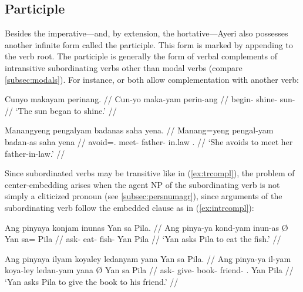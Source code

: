 \subsection{Participle}
\label{subsec:participle}
Besides the imperative---and, by extension, the hortative---Ayeri also 
possesses another infinite form called the participle. This form is marked by 
appending  to the verb root. The participle is generally the 
form of verbal complements of intransitive subordinating verbs other than 
modal verbs (compare \autoref{subsec:modals}). For instance,  
 or  both allow 
complementation with another verb:

\pex
\a\label{ex:intrcompl}\begingl
	\gla Cunyo makayam perinang. // 
	\glb Cun-yo maka-yam perin-ang // 
	\glc begin-\TsgN{} shine-\Ptcp{} sun-\Aarg{} //
	\glft `The sun began to shine.' //
\endgl

\a\label{ex:trcompl}\begingl
	\gla Manangyeng pengalyam badanas saha yena. //
	\glb Manang=yeng pengal-yam badan-as saha yena //
	\glc avoid=\TsgF{}.\Aarg{} meet-\Ptcp{} father-\Parg{} in.law 
		\TsgF{}.\Gen{} //
	\glft `She avoids to meet her father-in-law.' //
\endgl
\xe

Since subordinated verbs may be transitive like in (\ref{ex:trcompl}), the 
problem of center-embedding arises when the agent NP of the subordinating verb 
is not simply a cliticized pronoun (see \autoref{subsec:persnumagr}), since 
arguments of the subordinating verb follow the embedded clause as in 
(\ref{ex:intrcompl}):

\pex[*=\ques\ques]
\a\ljudge{\ques}\begingl
	\gla Ang pinyaya \normalfont{[}konjam inunas\normalfont{]} {} Yan sa 
		Pila. //
	\glb Ang pinya-ya kond-yam inun-as Ø Yan sa= Pila //
	\glc \AgtT{} ask-\TsgM{} eat-\Ptcp{} fish-\Parg{} \Top{} Yan \Parg{}
		Pila //
	\glft `Yan asks Pila to eat the fish.' //
\endgl

\a\ljudge{\ques\ques}\begingl
	\gla Ang pinyaya \normalfont{[}ilyam koyaley ledanyam 
		yana\normalfont{]} {} Yan sa Pila. //
	\glb Ang pinya-ya il-yam koya-ley ledan-yam yana Ø Yan sa Pila //
	\glc \AgtT{} ask-\TsgM{} give-\Ptcp{} book-\PargI{} friend-\Dat{} 
		\TsgM{}.\Gen{} \Top{} Yan \Parg{} Pila //
	\glft `Yan asks Pila to give the book to his friend.' //
\endgl
\xe

